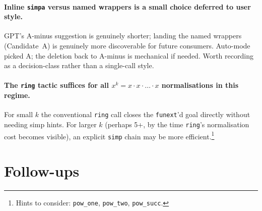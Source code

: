 \documentclass[11pt]{article}
\begin{document}
\paragraph{Inline \texttt{simpa} versus named wrappers is a small
choice deferred to user style.} GPT's A-minus suggestion is genuinely
shorter; landing the named wrappers (Candidate~A) is genuinely more
discoverable for future consumers. Auto-mode picked A; the deletion
back to A-minus is mechanical if needed. Worth recording as a
decision-class rather than a single-call style.

\paragraph{The \texttt{ring} tactic suffices for all
$x^k = x \cdot x \cdot \dots \cdot x$ normalisations in this regime.}
For small $k$ the conventional \texttt{ring} call closes the
\texttt{funext}'d goal directly without needing simp hints. For
larger $k$ (perhaps 5+, by the time \texttt{ring}'s normalisation cost
becomes visible), an explicit \texttt{simp} chain may be more
efficient.\footnote{Hints to consider: \texttt{pow\_one},
\texttt{pow\_two}, \texttt{pow\_succ}.}

\section{Follow-ups}
\end{document}
